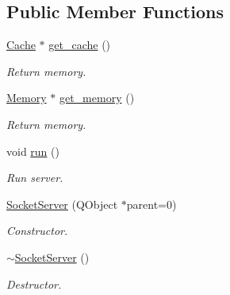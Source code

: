 \subsection*{Public Member Functions}
\begin{DoxyCompactItemize}
\item 
\hyperlink{classCache}{Cache} $\ast$ \hyperlink{classSocketServer_aaba9d7f97268569494b238b19c1558b5}{get\+\_\+cache} ()
\begin{DoxyCompactList}\small\item\em Return memory. \end{DoxyCompactList}\item 
\hyperlink{classMemory}{Memory} $\ast$ \hyperlink{classSocketServer_ad10dc09c0187d051829bf4073874268a}{get\+\_\+memory} ()
\begin{DoxyCompactList}\small\item\em Return memory. \end{DoxyCompactList}\item 
void \hyperlink{classSocketServer_afac9dc85dd014e6288551aa49f74f63f}{run} ()\hypertarget{classSocketServer_afac9dc85dd014e6288551aa49f74f63f}{}\label{classSocketServer_afac9dc85dd014e6288551aa49f74f63f}

\begin{DoxyCompactList}\small\item\em Run server. \end{DoxyCompactList}\item 
\hyperlink{classSocketServer_aaf00434c8b9e0cd301d9744dfea23559}{Socket\+Server} (Q\+Object $\ast$parent=0)\hypertarget{classSocketServer_aaf00434c8b9e0cd301d9744dfea23559}{}\label{classSocketServer_aaf00434c8b9e0cd301d9744dfea23559}

\begin{DoxyCompactList}\small\item\em Constructor. \end{DoxyCompactList}\item 
\hyperlink{classSocketServer_af0e595690e453ef4b8e8da174069aba9}{$\sim$\+Socket\+Server} ()\hypertarget{classSocketServer_af0e595690e453ef4b8e8da174069aba9}{}\label{classSocketServer_af0e595690e453ef4b8e8da174069aba9}

\begin{DoxyCompactList}\small\item\em Destructor. \end{DoxyCompactList}\end{DoxyCompactItemize}

